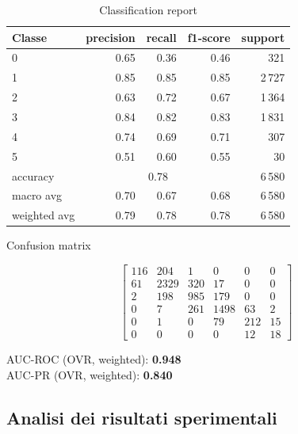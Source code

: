 \documentclass[a4paper,12pt]{report}
\begin{document}
	\begin{table}[H]
		\centering
		\caption{Classification report}
		\label{tab:cr_kan}
		\begin{tabular}{lrrrr}
			\toprule
			Classe & precision & recall & f1-score & support \\
			\midrule
			0 & 0.65 & 0.36 & 0.46 & 321 \\
			1 & 0.85 & 0.85 & 0.85 & 2\,727 \\
			2 & 0.63 & 0.72 & 0.67 & 1\,364 \\
			3 & 0.84 & 0.82 & 0.83 & 1\,831 \\
			4 & 0.74 & 0.69 & 0.71 & 307 \\
			5 & 0.51 & 0.60 & 0.55 & 30 \\
			\midrule
			accuracy & \multicolumn{3}{c}{0.78} & 6\,580 \\
			macro avg & 0.70 & 0.67 & 0.68 & 6\,580 \\
			weighted avg & 0.79 & 0.78 & 0.78 & 6\,580 \\
			\bottomrule
		\end{tabular}
	\end{table}
	
	\begin{table}[H]
		\centering
		\caption{Confusion matrix}
		\label{tab:cm_kan}
		\[
		\begin{bmatrix}
			116 & 204 & 1   & 0   & 0   & 0   \\
			61  & 2329& 320 & 17  & 0   & 0   \\
			2   & 198 & 985 & 179 & 0   & 0   \\
			0   & 7   & 261 & 1498& 63  & 2   \\
			0   & 1   & 0   & 79  & 212 & 15  \\
			0   & 0   & 0   & 0   & 12  & 18
		\end{bmatrix}
		\]
		\vspace{1mm}
		
		AUC-ROC (OVR, weighted): \textbf{0.948} \\
		AUC-PR  (OVR, weighted): \textbf{0.840}
	\end{table}
	
	\subsection{Analisi dei risultati sperimentali}
	
\end{document}
